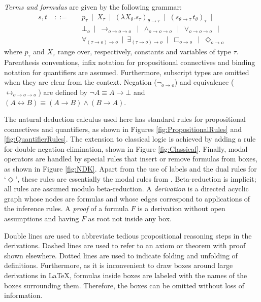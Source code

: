 \documentclass{llncs}
\newcommand{\imp}{\rightarrow}
\newcommand{\biimp}{\leftrightarrow}
\newcommand{\all}{\forall}
\newcommand{\ex}{\exists}
\newcommand{\nec}{\Box} %
\newcommand{\pos}{\Diamond} %
\begin{document}
\begin{definition} \emph{Terms and formulas} are given by the following grammar:
\begin{align*}
 s,t \quad ::= \quad & 
  p_\tau \ \mid \ 
  X_\tau \ \mid \
  (\lambda X_\theta.s_\tau)_{\theta\imp\tau} \ \mid \ 
  (s_{\theta\imp\tau}\, t_\theta)_\tau \ \mid \\
& \bot_o \ \mid \
  \imp_{o\imp o\imp o} \ \mid \ 
  \wedge_{o\imp o\imp o} \ \mid \
  \vee_{o\imp o\imp o} \ \mid \\
& \all_{(\tau\imp o)\imp o} \ \mid \ 
  \ex_{(\tau\imp o)\imp o} \ \mid \
  \nec_{o\imp o} \ \mid \
  \pos_{o\imp o}
\end{align*}
where $p_\tau$ and $X_\tau$ range over, respectively, constants and variables of type $\tau$. Parenthesis conventions, infix notation for propositional connectives and binding notation for quantifiers are assumed. Furthermore, subscript types are omitted when they are clear from the context. Negation ($\neg_{o\imp o}$) and equivalence ($\biimp_{o\imp o\imp o}$) are defined by $\neg A\equiv A\imp \bot$ and $ (A\biimp B)\equiv (A\imp B)\wedge (B\imp A)$.
\end{definition}


The natural deduction calculus used here has standard rules for propositional connectives and quantifiers, as shown in Figures \ref{fig:PropositionalRules} and \ref{fig:QuantifierRules}. The extension to classical logic is achieved by adding a rule for double negation elimination, shown in Figure \ref{fig:Classical}. Finally, modal operators are handled by special rules that insert or remove formulas from boxes, as shown in Figure \ref{fig:NDK}. Apart from the use of labels and the dual rules for `$\pos$', these rules are essentially the modal rules from \cite{todo}. Beta-reduction is implicit; all rules are assumed modulo beta-reduction. A \emph{derivation} is a directed acyclic graph whose nodes are formulas and whose edges correspond to applications of the inference rules. A \emph{proof} of a formula $F$ is a derivation without open assumptions and having $F$ as root not inside any box. 

Double lines are used to abbreviate tedious propositional reasoning steps in the derivations. Dashed lines are used to refer to an axiom or theorem with proof shown elsewhere. Dotted lines are used to indicate folding and unfolding of definitions. Furthermore, as it is inconvenient to draw boxes around large derivations in \LaTeX, formulas inside boxes are labeled with the names of the boxes surrounding them. Therefore, the boxes can be omitted without loss of information. 
\end{document}
